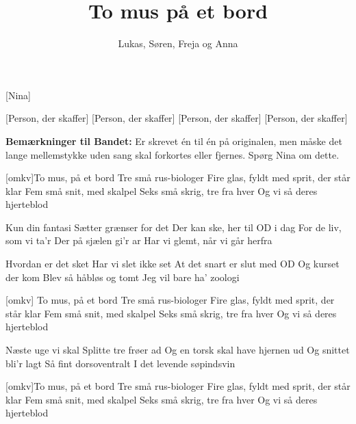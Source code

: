\documentclass[a4paper,11pt]{article}
\title{To mus på et bord}
\author{Lukas, Søren, Freja og Anna}
\begin{document}
\maketitle

\begin{roles}
    [Nina] 
\end{roles}

\begin{props}
    [Person, der skaffer]
[Person, der skaffer]
[Person, der skaffer]
[Person, der skaffer]

\end{props}

\textbf{Bemærkninger til Bandet:} Er skrevet én til én på originalen, men måske det lange mellemstykke uden sang skal forkortes eller fjernes. Spørg Nina om dette.

\begin{song}

  [omkv]To mus, på et bord
Tre små rus-biologer
Fire glas, fyldt med sprit, der står klar
Fem små snit, med skalpel
Seks små skrig, tre fra hver
Og vi så deres hjerteblod

   Kun din fantasi
Sætter grænser for det
Der kan ske, her til OD i dag
For de liv, som vi ta’r
Der på sjælen gi’r ar
Har vi glemt, når vi går herfra

   Hvordan er det sket
Har vi slet ikke set
At det snart er slut med OD
Og kurset der kom
Blev så håbløs og tomt
Jeg vil bare ha’ zoologi

   [omkv] To mus, på et bord
Tre små rus-biologer
Fire glas, fyldt med sprit, der står klar
Fem små snit, med skalpel
Seks små skrig, tre fra hver
Og vi så deres hjerteblod

   Næste uge vi skal
Splitte tre frøer ad
Og en torsk skal have hjernen ud
Og snittet bli'r lagt
Så fint dorsoventralt
I det levende søpindsvin

  [omkv]To mus, på et bord
Tre små rus-biologer
Fire glas, fyldt med sprit, der står klar
Fem små snit, med skalpel
Seks små skrig, tre fra hver
Og vi så deres hjerteblod

\end{song}
\end{document}

